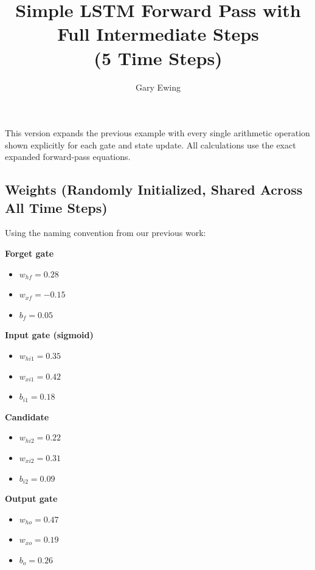 \documentclass[12pt]{article}
\begin{document}
\title{Simple LSTM Forward Pass with Full Intermediate Steps \\ (5 Time Steps)}
\author{Gary Ewing}
\date{}
\maketitle

This version expands the previous example with every single arithmetic operation shown explicitly for each gate and state update. All calculations use the exact expanded forward-pass equations.

\subsection*{Weights (Randomly Initialized, Shared Across All Time Steps)}

Using the naming convention from our previous work:

\textcolor{headingRed}{\textbf{Forget gate}}
\begin{itemize}[leftmargin=*]
    \item $w_{hf} = 0.28$
    \item $w_{xf} = -0.15$
    \item $b_f = 0.05$
\end{itemize}

\textcolor{headingRed}{\textbf{Input gate (sigmoid)}}
\begin{itemize}[leftmargin=*]
    \item $w_{hi1} = 0.35$
    \item $w_{xi1} = 0.42$
    \item $b_{i1} = 0.18$
\end{itemize}

\textcolor{headingRed}{\textbf{Candidate}}
\begin{itemize}[leftmargin=*]
    \item $w_{hi2} = 0.22$
    \item $w_{xi2} = 0.31$
    \item $b_{i2} = 0.09$
\end{itemize}

\textcolor{headingRed}{\textbf{Output gate}}
\begin{itemize}[leftmargin=*]
    \item $w_{ho} = 0.47$
    \item $w_{xo} = 0.19$
    \item $b_o = 0.26$
\end{itemize}
\end{document}
